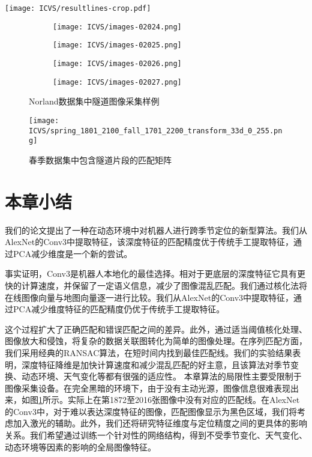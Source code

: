 \begin{figure*}[t]
  \centering
  \texttt{[image: ICVS/resultlines-crop.pdf]}
  \caption{3000张图片匹配结果}  
  \label{fig:ExperimentResult}
\end{figure*}

\begin{figure}[htbp]
 \centering
 \begin{subfigure}[h]{0.23\textwidth}
    \texttt{[image: ICVS/images-02024.png]}
 \end{subfigure}
 \begin{subfigure}[h]{0.23\textwidth}
    \texttt{[image: ICVS/images-02025.png]}
 \end{subfigure}
 \begin{subfigure}[h]{0.23\textwidth}
    \texttt{[image: ICVS/images-02026.png]}
 \end{subfigure}
 \begin{subfigure}[h]{0.23\textwidth}
    \texttt{[image: ICVS/images-02027.png]}
 \end{subfigure}
 \caption{Norland数据集中隧道图像采集样例}
\end{figure}

\begin{figure}[t]
  \centering
  \texttt{[image: ICVS/spring\_1801\_2100\_fall\_1701\_2200\_transform\_33d\_0\_255.png]} 
  \label{fig:Dark}
  \caption{春季数据集中包含隧道片段的匹配矩阵}
\end{figure}


\section{本章小结}

我们的论文提出了一种在动态环境中对机器人进行跨季节定位的新型算法。我们从AlexNet的Conv3中提取特征，该深度特征的匹配精度优于传统手工提取特征，通过PCA减少维度是一个新的尝试。

事实证明，Conv3是机器人本地化的最佳选择。相对于更底层的深度特征它具有更快的计算速度，并保留了一定语义信息，减少了图像混乱匹配。我们通过核化法将在线图像向量与地图向量逐一进行比较。我们从AlexNet的Conv3中提取特征，通过PCA减少维度特征的匹配精度仍优于传统手工提取特征。

这个过程扩大了正确匹配和错误匹配之间的差异。此外，通过适当阈值核化处理、图像放大和侵蚀，将复杂的数据关联图转化为简单的图像处理。在序列匹配方面，我们采用经典的RANSAC算法，在短时间内找到最佳匹配线。我们的实验结果表明，深度特征降维是加快计算速度和减少混乱匹配的好主意，且该算法对季节变换、动态环境、天气变化等都有很强的适应性。
本章算法的局限性主要受限制于图像采集设备。在完全黑暗的环境下，由于没有主动光源，图像信息很难表现出来，如图\ref{fig:Dark}所示。实际上在第1872至2016张图像中没有对应的匹配线。在AlexNet的Conv3中，对于难以表达深度特征的图像，匹配图像显示为黑色区域，我们将考虑加入激光的辅助。此外，我们还将研究特征维度与定位精度之间的更具体的影响关系。我们希望通过训练一个针对性的网络结构，得到不受季节变化、天气变化、动态环境等因素的影响的全局图像特征。



